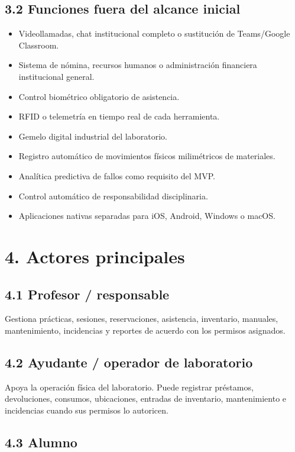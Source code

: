 \documentclass[12pt]{article}
\begin{document}
\subsection*{3.2 Funciones fuera del alcance inicial}

\begin{itemize}[leftmargin=1.2cm]
    \item Videollamadas, chat institucional completo o sustitución de Teams/Google Classroom.
    \item Sistema de nómina, recursos humanos o administración financiera institucional general.
    \item Control biométrico obligatorio de asistencia.
    \item RFID o telemetría en tiempo real de cada herramienta.
    \item Gemelo digital industrial del laboratorio.
    \item Registro automático de movimientos físicos milimétricos de materiales.
    \item Analítica predictiva de fallos como requisito del MVP.
    \item Control automático de responsabilidad disciplinaria.
    \item Aplicaciones nativas separadas para iOS, Android, Windows o macOS.
\end{itemize}

\section*{4. Actores principales}

\subsection*{4.1 Profesor / responsable}

Gestiona prácticas, sesiones, reservaciones, asistencia, inventario, manuales, mantenimiento, incidencias y reportes de acuerdo con los permisos asignados.

\subsection*{4.2 Ayudante / operador de laboratorio}

Apoya la operación física del laboratorio. Puede registrar préstamos, devoluciones, consumos, ubicaciones, entradas de inventario, mantenimiento e incidencias cuando sus permisos lo autoricen.

\subsection*{4.3 Alumno}
\end{document}
